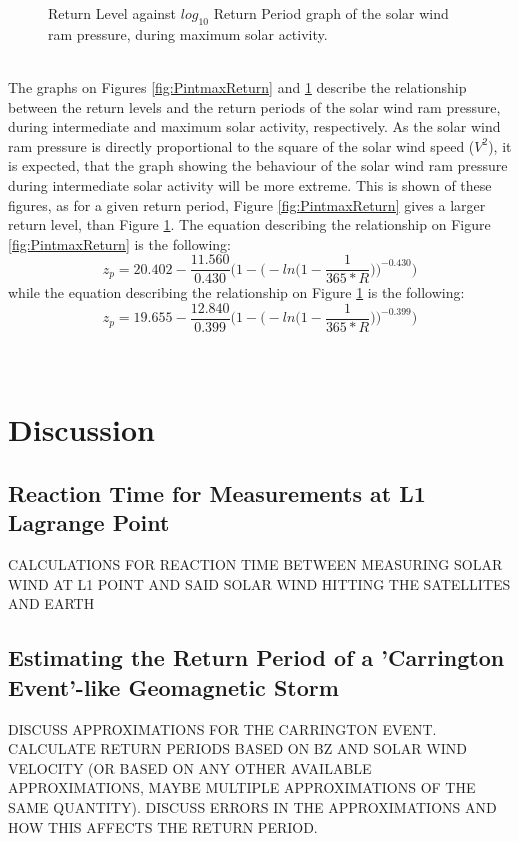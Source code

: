 \documentclass[11pt]{article}
\begin{document}
\begin{figure}[t!]
\begin{minipage}{0.48\textwidth}
                \caption{Return Level against $log_{10}$ Return Period graph of the solar wind ram pressure, during maximum solar activity.}
                \label{fig:PmaxmaxReturn}
            \end{minipage}
        \end{figure}\\
        The graphs on Figures \ref{fig:PintmaxReturn} and \ref{fig:PmaxmaxReturn} describe the relationship between the return levels and the return periods of the solar wind ram pressure, during intermediate and maximum solar activity, respectively. As the solar wind ram pressure is directly proportional to the square of the solar wind speed ($V^2$), it is expected, that the graph showing the behaviour of the solar wind ram pressure during intermediate solar activity will be more extreme. This is shown of these figures, as for a given return period, Figure \ref{fig:PintmaxReturn} gives a larger return level, than Figure \ref{fig:PmaxmaxReturn}. The equation describing the relationship on Figure \ref{fig:PintmaxReturn} is the following:
        \begin{equation}
            z_p =20.402-\frac{11.560}{0.430}\Bigg( 1-\Bigg( -ln\Bigg( 1-\frac{1}{365*R}\Bigg) \Bigg) ^{-0.430}\Bigg)
        \end{equation}
        while the equation describing the relationship on Figure \ref{fig:PmaxmaxReturn} is the following:
        \begin{equation}
            z_p = 19.655-\frac{12.840}{0.399}\Bigg( 1-\Bigg( -ln\Bigg( 1-\frac{1}{365*R}\Bigg) \Bigg) ^{-0.399}\Bigg)
        \end{equation}\\ \\
\section{Discussion}\label{sec:discussion}
    \subsection{Reaction Time for Measurements at L1 Lagrange Point}
        CALCULATIONS FOR REACTION TIME BETWEEN MEASURING SOLAR WIND AT L1 POINT AND SAID SOLAR WIND HITTING THE SATELLITES AND EARTH
    \subsection{Estimating the Return Period of a 'Carrington Event'-like Geomagnetic Storm}\label{sec:carrington}
        DISCUSS APPROXIMATIONS FOR THE CARRINGTON EVENT. CALCULATE RETURN PERIODS BASED ON BZ AND SOLAR WIND VELOCITY (OR BASED ON ANY OTHER AVAILABLE APPROXIMATIONS, MAYBE MULTIPLE APPROXIMATIONS OF THE SAME QUANTITY). DISCUSS ERRORS IN THE APPROXIMATIONS AND HOW THIS AFFECTS THE RETURN PERIOD.
\end{document}
